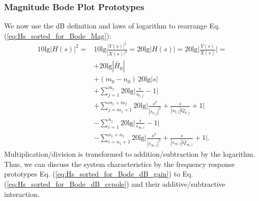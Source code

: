 \documentclass[11pt,a4paper,DIV=12]{scrartcl}
\numberwithin{equation}{section}
\numberwithin{figure}{section}
\newcommand{\eq}[1]{Eq. (\ref{#1})} %
\begin{document}
\subsubsection{Magnitude Bode Plot Prototypes}
We now use the dB definition and laws of logarithm to rearrange \eq{eq:Hs_sorted_for_Bode_Mag}:
\begin{align}
10 \text{lg} |H(s)|^2 =
& 10 \text{lg} \frac{|Y(s)|^2}{|X(s)|^2} =
20 \text{lg} |H(s)| = 20 \text{lg} \bigg|\frac{Y(s)}{X(s)}\bigg| =\nonumber\\
\label{eq:Hs_sorted_for_Bode_dB_gain}
& +20 \text{lg} |\tilde{H_0}|\\
\label{eq:Hs_sorted_for_Bode_dB_origin}
& +(m_0-n_0) \, 20 \text{lg} |s|\\
\label{eq:Hs_sorted_for_Bode_dB_zero}
& +\sum\limits_{j=1}^{m_1} 20 \text{lg}  \bigg|\frac{s}{s_{0,j}}-1\bigg|\\
\label{eq:Hs_sorted_for_Bode_dB_cczero}
& +\sum\limits_{j=m_1+1}^{m_1+m_2} 20 \text{lg} \bigg|\frac{s^2}{|s_{0,j}|^2} + \frac{s}{|s_{0,j}| Q_{0,j}} + 1\bigg|\\
\label{eq:Hs_sorted_for_Bode_dB_pole}
&-\sum\limits_{i=1}^{n_1} 20 \text{lg} \bigg|\frac{s}{s_{\infty,i}}-1\bigg|\\
\label{eq:Hs_sorted_for_Bode_dB_ccpole}
&-\sum\limits_{i=n_1+1}^{n_1+n_2} 20 \text{lg} \bigg|\frac{s^2}{|s_{\infty,i}|^2} + \frac{s}{|s_{\infty,i}| Q_{\infty,i}} + 1\bigg|.
\end{align}
%
Multiplication/division is transformed to addition/subtraction by the logarithm.
Thus, we can discuss the system characteristics by the frequency response prototypes
\eq{eq:Hs_sorted_for_Bode_dB_gain} to \eq{eq:Hs_sorted_for_Bode_dB_ccpole} and
their additive/subtractive interaction.
\end{document}
